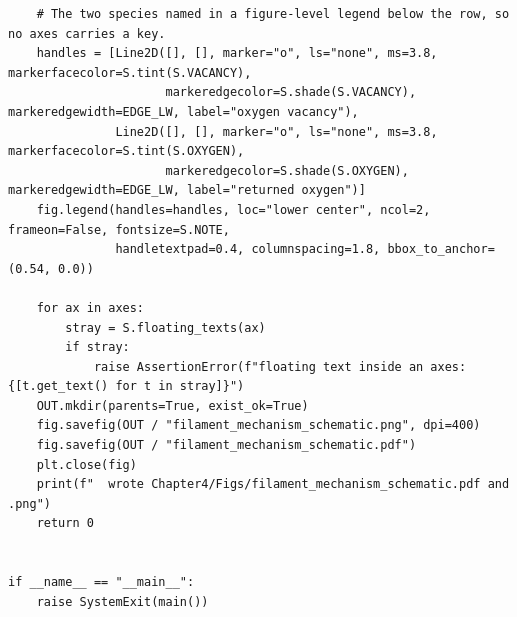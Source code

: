 \documentclass[a4paper,10pt]{article}
\begin{document}
\begin{Verbatim}
    # The two species named in a figure-level legend below the row, so no axes carries a key.
    handles = [Line2D([], [], marker="o", ls="none", ms=3.8, markerfacecolor=S.tint(S.VACANCY),
                      markeredgecolor=S.shade(S.VACANCY), markeredgewidth=EDGE_LW, label="oxygen vacancy"),
               Line2D([], [], marker="o", ls="none", ms=3.8, markerfacecolor=S.tint(S.OXYGEN),
                      markeredgecolor=S.shade(S.OXYGEN), markeredgewidth=EDGE_LW, label="returned oxygen")]
    fig.legend(handles=handles, loc="lower center", ncol=2, frameon=False, fontsize=S.NOTE,
               handletextpad=0.4, columnspacing=1.8, bbox_to_anchor=(0.54, 0.0))

    for ax in axes:
        stray = S.floating_texts(ax)
        if stray:
            raise AssertionError(f"floating text inside an axes: {[t.get_text() for t in stray]}")
    OUT.mkdir(parents=True, exist_ok=True)
    fig.savefig(OUT / "filament_mechanism_schematic.png", dpi=400)
    fig.savefig(OUT / "filament_mechanism_schematic.pdf")
    plt.close(fig)
    print(f"  wrote Chapter4/Figs/filament_mechanism_schematic.pdf and .png")
    return 0


if __name__ == "__main__":
    raise SystemExit(main())
\end{Verbatim}
\end{document}

